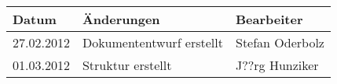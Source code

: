 \begin{tabular}{|l|l|l|}
\hline 
Datum & Änderungen & Bearbeiter \\ 
\hline 
27.02.2012 & Dokumententwurf erstellt & Stefan Oderbolz \\ 
\hline 
01.03.2012 & Struktur erstellt & J??rg Hunziker \\ 
\hline 
\end{tabular} 
